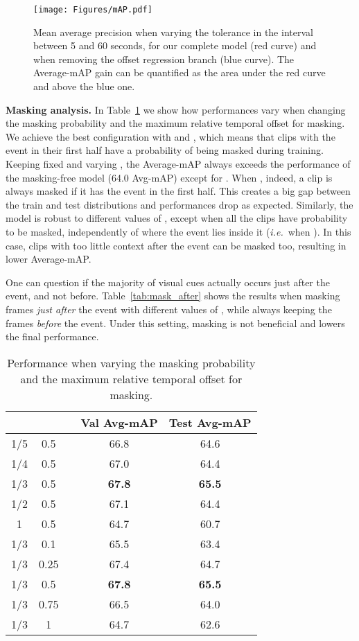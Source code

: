 \documentclass[a4paper,conference]{IEEEtran}
\newcommand{\tit}[1]{\smallbreak\noindent\textbf{#1.}}
\def \ie {\emph{i.e.}}
\begin{document}
\begin{figure}[t]
\centering
\texttt{[image: Figures/mAP.pdf]}
\caption{Mean average precision when varying the tolerance  in the interval between 5 and 60 seconds, for our complete model (red curve) and when removing the offset regression branch (blue curve). The Average-mAP gain can be quantified as the area under the red curve and above the blue one.}
\label{fig:mAP}
\end{figure}

\tit{Masking analysis}
In Table~\ref{tab:mask_bafore} we show how performances vary when changing the masking probability  and the  maximum relative temporal offset  for masking. We achieve the best configuration with  and , which means that clips with the event in their first half have a  probability of being masked during training. Keeping  fixed and varying , the Average-mAP always exceeds the performance of the masking-free model (64.0 Avg-mAP) except for . When , indeed, a clip is always masked if it has the event in the first half. This creates a big gap between the train and test distributions and performances drop as expected. Similarly, the model is robust to different values of , except when all the clips have probability  to be masked, independently of where the event lies inside it (\ie~when ). In this case, clips with too little context after the event can be masked too, resulting in lower Average-mAP.

One can question if the majority of visual cues actually occurs just after the event, and not before. Table~\ref{tab:mask_after} shows the results when masking frames \textit{just after} the event with different values of , while always keeping the frames \textit{before} the event. Under this setting, masking is not beneficial and lowers the final performance.

\begin{table}[t]
\centering
\caption{Performance when varying the masking probability  and the maximum relative temporal offset  for masking.}
\begin{tabular}{ccccc}
    \toprule 
     &  & & Val Avg-mAP & Test Avg-mAP \\
    \midrule
    1/5 & 0.5 & & 66.8 & 64.6 \\
    1/4 & 0.5 & & 67.0 & 64.4 \\
    1/3 & 0.5 & & \textbf{67.8} & \textbf{65.5} \\
    1/2 & 0.5 & & 67.1 & 64.4 \\
    1 & 0.5 & & 64.7 & 60.7 \\
    \cmidrule{1-2}
    \cmidrule{4-5}
    1/3 & 0.1 & & 65.5 & 63.4 \\
    1/3 & 0.25 & & 67.4 & 64.7 \\
    1/3 & 0.5 & & \textbf{67.8} & \textbf{65.5} \\
    1/3 & 0.75 & & 66.5 & 64.0 \\
    1/3 & 1 & & 64.7 & 62.6 \\
    \bottomrule
\end{tabular}
\label{tab:mask_bafore}
\end{table}
\end{document}
